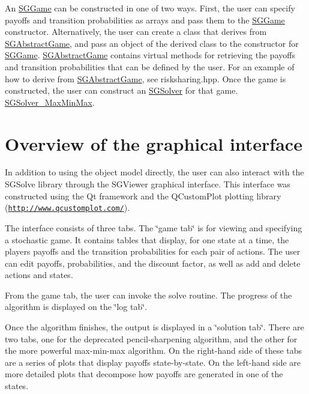 An \hyperlink{classSGGame}{S\+G\+Game} can be constructed in one of two ways. First, the user can specify payoffs and transition probabilities as arrays and pass them to the \hyperlink{classSGGame}{S\+G\+Game} constructor. Alternatively, the user can create a class that derives from \hyperlink{classSGAbstractGame}{S\+G\+Abstract\+Game}, and pass an object of the derived class to the constructor for \hyperlink{classSGGame}{S\+G\+Game}. \hyperlink{classSGAbstractGame}{S\+G\+Abstract\+Game} contains virtual methods for retrieving the payoffs and transition probabilities that can be defined by the user. For an example of how to derive from \hyperlink{classSGAbstractGame}{S\+G\+Abstract\+Game}, see risksharing.\+hpp. Once the game is constructed, the user can construct an \hyperlink{classSGSolver}{S\+G\+Solver} for that game. \hyperlink{classSGSolver__MaxMinMax}{S\+G\+Solver\+\_\+\+Max\+Min\+Max}.\hypertarget{index_viewersec}{}\section{Overview of the graphical interface}\label{index_viewersec}
In addition to using the object model directly, the user can also interact with the S\+G\+Solve library through the S\+G\+Viewer graphical interface. This interface was constructed using the Qt framework and the Q\+Custom\+Plot plotting library (\href{http://www.qcustomplot.com/}{\tt http\+://www.\+qcustomplot.\+com/}).

The interface consists of three tabs. The \char`\"{}game tab\char`\"{} is for viewing and specifying a stochastic game. It contains tables that display, for one state at a time, the players\textquotesingle{} payoffs and the transition probabilities for each pair of actions. The user can edit payoffs, probabilities, and the discount factor, as well as add and delete actions and states.

From the game tab, the user can invoke the solve routine. The progress of the algorithm is displayed on the \char`\"{}log tab\char`\"{}.

Once the algorithm finishes, the output is displayed in a \char`\"{}solution
tab\char`\"{}. There are two tabs, one for the deprecated pencil-\/sharpening algorithm, and the other for the more powerful max-\/min-\/max algorithm. On the right-\/hand side of these tabs are a series of plots that display payoffs state-\/by-\/state. On the left-\/hand side are more detailed plots that decompose how payoffs are generated in one of the states.

